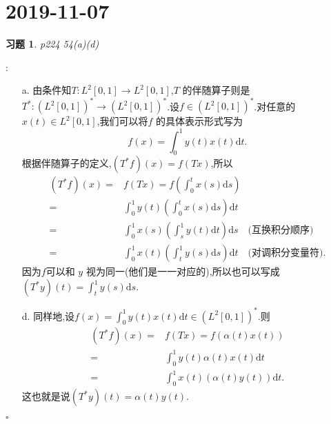 \documentclass[a4paper]{article}
\newtheorem*{exe}{习题}
\newenvironment{sol}{{\noindent\bfseries 解}:}{\hfill $\square$\par}
\begin{document}
\section{2019-11-07}
\begin{exe}
  p224 54(a)(d)
\end{exe}
\begin{sol}
  \begin{enumerate}
    \item[a.] 由条件知$T:L^2[0,1]\to L^2[0,1]$,$T$ 的伴随算子则是$T^*:\left( L^2[0,1] \right)^*\to \left( L^2[0,1] \right)^* $.设$f\in \left( L^2[0,1] \right) ^*$.对任意的$x(t)\in L^2[0,1]$,我们可以将$f$ 的具体表示形式写为
       \[
	 f(x)=\int_0^1y(t)x(t)\mathrm{d}t
       .\] 
       根据伴随算子的定义,$(T^*f)(x)=f(Tx)$,所以
        \begin{align*}
	  (T^*f)(x)=&f(Tx)=f\left( \int_0^tx(s)\mathrm{d}s \right) \\
	  =&\int_0^1y(t)\left( \int_0^tx(s)\mathrm{d}s \right) \mathrm{d}t\\
	  =& \int_0^1x(s)\left( \int_s^1y(t)\mathrm{d}t \right)\mathrm{d}s\quad\text{(互换积分顺序)}\\
	  =&\int_0^1x(t)\left( \int_t^1y(s)\mathrm{d}s \right) \mathrm{d}t\quad\text{(对调积分变量符)}
       .\end{align*}
       因为$f$可以和 $y$ 视为同一(他们是一一对应的),所以也可以写成$(T^*y)(t)=\int_t^1y(s)\mathrm{d}s$.
     \item[d.] 同样地,设$f(x)=\int_0^1y(t)x(t)\mathrm{d}t\in \left( L^2[0,1] \right) ^*$.则
       \begin{align*}
	 \left( T^*f \right) (x)= & f(Tx)=f\left( \alpha(t)x(t) \right) \\
	 = & \int_0^1y(t)\alpha(t)x(t)\mathrm{d}t\\
	 = & \int_0^1x(t)\left( \alpha(t)y(t) \right) \mathrm{d}t
       .\end{align*}
       这也就是说$(T^*y)(t)=\alpha(t)y(t)$.
  \end{enumerate}
\end{sol}
\end{document}
